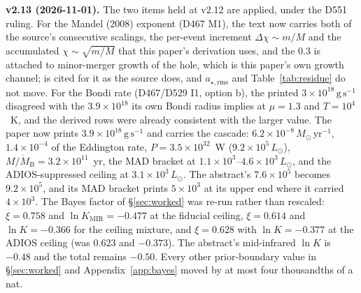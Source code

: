 \documentclass[11pt]{article}
\newcommand{\msun}{\ensuremath{M_\odot}}
\newcommand{\lnK}{\ensuremath{\ln K}}
\begin{document}
\textbf{v2.13 (2026-11-01).} The two items held at v2.12 are applied, under the D551 ruling. For the Mandel (2008) exponent (D467 M1), the text now carries both of the source's consecutive scalings, the per-event increment $\Delta\chi \sim m/M$ and the accumulated $\chi \sim \sqrt{m/M}$ that this paper's derivation uses, and the $0.3$ is attached to minor-merger growth of the hole, which is this paper's own growth channel; \citet{HughesBlandford2003} is cited for it as the source does, and $a_{\star,\mathrm{rms}}$ and Table~\ref{tab:residue} do not move. For the Bondi rate (D467/D529 I1, option b), the printed $3\times10^{18}\,\mathrm{g\,s^{-1}}$ disagreed with the $3.9\times10^{18}$ its own Bondi radius implies at $\mu = 1.3$ and $T = 10^{4}$~K, and the derived rows were already consistent with the larger value. The paper now prints $3.9\times10^{18}\,\mathrm{g\,s^{-1}}$ and carries the cascade: $6.2\times10^{-8}\,\msun\,\mathrm{yr^{-1}}$, $1.4\times10^{-4}$ of the Eddington rate, $P = 3.5\times10^{32}$~W ($9.2\times10^{5}\,L_{\odot}$), $M/\dot{M}_{\mathrm{B}} = 3.2\times10^{11}$~yr, the MAD bracket at $1.1\times10^{3}$--$4.6\times10^{3}\,L_{\odot}$, and the ADIOS-suppressed ceiling at $3.1\times10^{3}\,L_{\odot}$. The abstract's $7.6\times10^{5}$ becomes $9.2\times10^{5}$, and its MAD bracket prints $5\times10^{3}$ at its upper end where it carried $4\times10^{3}$. The Bayes factor of \S\ref{sec:worked} was re-run rather than rescaled: $\xi = 0.758$ and $\lnK_{\mathrm{MIR}} = -0.477$ at the fiducial ceiling, $\xi = 0.614$ and $\lnK = -0.366$ for the ceiling mixture, and $\xi = 0.628$ with $\lnK = -0.377$ at the ADIOS ceiling (was $0.623$ and $-0.373$). The abstract's mid-infrared $\lnK$ is $-0.48$ and the total remains $-0.50$. Every other prior-boundary value in \S\ref{sec:worked} and Appendix~\ref{app:bayes} moved by at most four thousandths of a nat.
\end{document}
